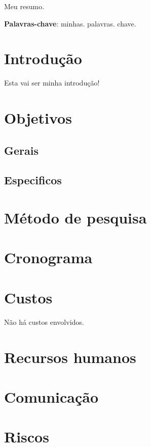 \documentclass[
  12pt,
  openright,
  twoside,
  a4paper,
  english,
  brazil
]{abntex2}
\begin{document}
\pretextual{}
\imprimircapa{}
\imprimirfolhaderosto{}

\begin{folhadeaprovacao}
  
\end{folhadeaprovacao}

\begin{resumo}
Meu resumo.

\vspace{\onelineskip}
\noindent
\textbf{Palavras-chave}: minhas\@. palavras\@. chave.

\end{resumo}

\begin{KeepFromToc}
  \tableofcontents
\end{KeepFromToc}

\textual{}

\chapter{Introdução}\label{cap:introdução}

Esta vai ser minha introdução\cite{dijkstra1968}!

\chapter{Objetivos}\label{cap:objetivos}

\section{Gerais}

\section{Especificos}

\chapter{Método de pesquisa}\label{cap:metodo_de_pesquisa}

\chapter{Cronograma}\label{cap:cronograma}

\chapter{Custos}\label{cap:custos}

Não há custos envolvidos.

\chapter{Recursos humanos}\label{cap:recursos_humanos}

\chapter{Comunicação}\label{cap:comunicacao}

\chapter{Riscos}\label{cap:riscos}

\postextual{}


\end{document}

